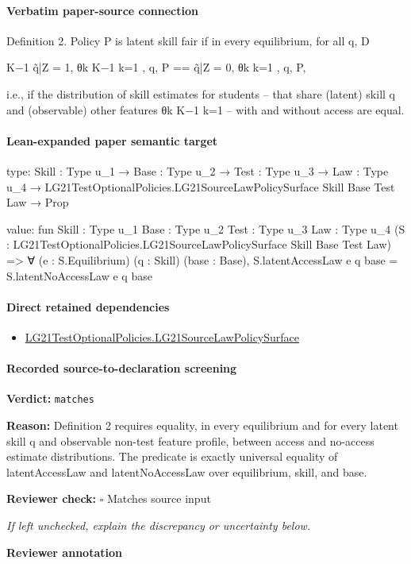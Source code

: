 \documentclass[10pt]{article}
\newcommand{\reviewerbox}{%
  \par\noindent\fbox{\parbox{0.96\linewidth}{\rule{0pt}{0.38in}}}\par
}
\newcommand{\reviewmatch}[1]{%
  \par\noindent\textbf{Reviewer check:} $\square$\; #1\par
  \noindent\emph{If left unchecked, explain the discrepancy or uncertainty below.}\par
}
\begin{document}
\paragraph{Verbatim paper-source connection}
\begin{ReviewVerbatim}
Definition 2. Policy P is latent skill fair if in every equilibrium, for all q,
D

K−1
q̃|Z = 1, {θk }K−1
k=1 , q, P == q̃|Z = 0, {θk }k=1 , q, P,

i.e., if the distribution of skill estimates for students – that share (latent) skill q and (observable)
other features {θk }K−1
k=1 – with and without access are equal.
\end{ReviewVerbatim}



\paragraph{Lean-expanded paper semantic target}
\begin{ReviewVerbatim}
type:
{Skill : Type u_1} →
  {Base : Type u_2} →
    {Test : Type u_3} →
      {Law : Type u_4} → LG21TestOptionalPolicies.LG21SourceLawPolicySurface Skill Base Test Law → Prop

value:
fun {Skill : Type u_1} {Base : Type u_2} {Test : Type u_3} {Law : Type u_4}
    (S : LG21TestOptionalPolicies.LG21SourceLawPolicySurface Skill Base Test Law) =>
  ∀ (e : S.Equilibrium) (q : Skill) (base : Base), S.latentAccessLaw e q base = S.latentNoAccessLaw e q base
\end{ReviewVerbatim}

\paragraph{Direct retained dependencies}
\begin{itemize}\raggedright
\item \hyperlink{governing-declaration-48965123e52b8b0f}{LG21\allowbreak{}Test\allowbreak{}Optional\allowbreak{}Policies.\allowbreak{}LG21\allowbreak{}Source\allowbreak{}Law\allowbreak{}Policy\allowbreak{}Surface}
\end{itemize}
\paragraph{Recorded source-to-declaration screening}
\textbf{Verdict:} \texttt{matches}
\\
{\raggedright
\textbf{Reason:} Definition 2 requires equality, in every equilibrium and for every latent skill q and observable non-\allowbreak{}test feature profile, between access and no-\allowbreak{}access estimate distributions.\allowbreak{} The predicate is exactly universal equality of latentAccessLaw and latentNoAccessLaw over equilibrium, skill, and base.\allowbreak{}
\par}
\reviewmatch{Matches source input}
\noindent\textbf{Reviewer annotation}\par
\reviewerbox
\clearpage
\hypertarget{paper-prerequisite-a01f7afb43c09d7e}{}
\end{document}
